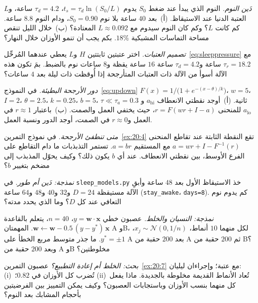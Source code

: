 \begin{exercise}[\lvlA]
\label{ex:20:2}
\emph{دَين النوم.} النوم الذي يبدأ عند ضغط $S_0$ يدوم $t_s=\tau_d\ln(S_0/L)$، $\tau_d=4.2$ ساعة، و$L$ العتبة الدنيا عند الاستيقاظ. (أ)~بعد $40$ ساعة بلا نوم $S_0=0.90$، ودام النوم $8.8$ ساعة. كم كانت $L$؟ وكم كان النوم سيدوم مع $L\approx0.092$ المعتادة؟ (ب)~خلال الليل تنقص مساحة التماسات المشبكية $18\%$. بكم يجب أن تنمو الأوزان خلال النهار؟
\end{exercise}

\begin{exercise}[\lvlB]
\label{ex:20:3}
\emph{تصميم العتبات.} اختر عتبتين ثابتتين $H$ و$L$ يعطي عندهما المُرحِّل~\eqref{eq:sleeppressure} مع $\tau_r=18.2$ ساعة و$\tau_d=4.2$ ساعة $16$ ساعة يقظة و$8$ ساعات نوم بالضبط. بمَ تكون هذه الآلة أسوأ من الآلة ذات العتبات المتأرجحة إذا أُوقظت ذات ليلة بعد $4$ ساعات؟
\end{exercise}

\begin{exercise}[\lvlB]
\label{ex:20:4}
\emph{دور الأرجحة البطيئة.} في النموذج~\eqref{eq:updown} $F(x)=1/\bigl(1+e^{-(x-\theta)/k}\bigr)$، $w=5$، $I=2$، $\theta=2.5$، $k=0.25$، $b=5$، $\tau\ll\tau_a=0.3$ ثانية. (أ)~أوجد نقطتي الانعطاف $a_{\text{hi}}$ و$a_{\text{lo}}$ للمنحنى $r=F(wr+I-a)$، حيث يختفي العمل والصمت. (ب)~باعتبار $r\approx1$ في العمل و$r\approx0$ في الصمت، أوجد الدور ونسبة العمل.
\end{exercise}

\begin{exercise}[\lvlB]
\label{ex:20:5}
\emph{متى تنطفئ الأرجحة.} في نموذج التمرين~\ref{ex:20:4} تقع النقطة الثابتة عند تقاطع المنحنى $a=wr+I-F^{-1}(r)$ مع المستقيم $a=br$. تستمر التذبذبات ما دام التقاطع على الفرع الأوسط، بين نقطتي الانعطاف. عند أي $b$ يكون ذلك؟ وكيف يحوّل  المذبذب إلى مضخم بتغيير $b$؟
\end{exercise}

\begin{exercise}[\lvlB]
\label{ex:20:6}
\emph{نمذجة: دَين أم طور.} في \texttt{sleep\_models.py} خذ الاستيقاظ الأول بعد $48$ ساعة وأبقِ الآلة مستيقظة $D=24$ و$32$ و$40$ و$48$ و$64$ ساعة (\texttt{stay\_awake}، \texttt{days=8}). كم يدوم نوم التعافي عند كل $D$؟ وما الذي يحدد مدته؟
\end{exercise}

\begin{exercise}[\lvlB]
\label{ex:20:7}
\emph{نمذجة: النسيان والخلط.} عصبون خطي $y=\mathbf w\cdot\mathbf x$، $n=40$، يتعلم بالقاعدة $\mathbf w\leftarrow\mathbf w-0.5\,(y-y^*)\,\mathbf x$. المهمتان A وB، لكل منهما $10$ أنماط، $x_j\sim\mathcal N(0,1/n)$، $y^*=\pm1$. ما جذر متوسط مربع الخطأ على A بعد $200$ حقبة من A ثم $200$ حقبة من B؟ وبعد $200$ حقبة من A وB مخلوطتين؟
\end{exercise}

\begin{exercise}[\lvlC]
\label{ex:20:8}
\emph{بحث: الخلط أم إعادة التطبيع؟} عصبون التمرين~\ref{ex:20:7} مع عتبة؛ وإجراءان ليليان: (i)~تُضرب كل الأوزان في $0.82$؛ (ii)~تُعاد الأنماط القديمة مخلوطة بالجديدة. ماذا يفعل كل منهما بنسب الأوزان وباستجابات العصبون؟ وكيف يمكن التمييز بين الفرضيتين بأحجام المشابك بعد النوم؟
\end{exercise}
